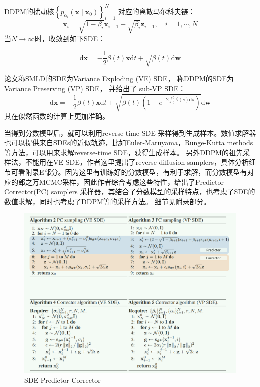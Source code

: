 \documentclass[lang=cn,newtx,10pt,scheme=chinese]{elegantbook}
\begin{document}
DDPM的扰动核$\left\{p_{\alpha_i}\left(\mathbf{x} \mid \mathbf{x}_0\right)\right\}_{i=1}^N$
对应的离散马尔科夫链：
\begin{equation}
\mathbf{x}_i=\sqrt{1-\beta_i} \mathbf{x}_{i-1}+\sqrt{\beta_i} \mathbf{z}_{i-1}, \quad i=1, \cdots, N
\end{equation}
当$N \rightarrow \infty$时，收敛到如下SDE：

\begin{equation}
\mathrm{d} \mathbf{x}=-\frac{1}{2} \beta(t) \mathbf{x} \mathrm{d} t+\sqrt{\beta(t)} \mathrm{d} \mathbf{w}
\end{equation}

论文称SMLD的SDE为Variance Exploding (VE) SDE， 称DDPM的SDE为Variance Preserving (VP) SDE， 并给出了 sub-VP SDE：
\begin{equation}
\mathrm{d} \mathbf{x}=-\frac{1}{2} \beta(t) \mathbf{x} \mathrm{d} t+\sqrt{\beta(t)\left(1-e^{-2 \int_0^t \beta(s) \mathrm{d} s}\right)} \mathrm{d} \mathbf{w}
\end{equation}其在似然函数的计算上更加准确。

当得到分数模型后，就可以利用reverse-time SDE 采样得到生成样本。数值求解器也可以提供来自SDEs的近似轨迹，比如Euler-Maruyama，Runge-Kutta methods等方法，可以用来求解reverse-time SDE，获得生成样本。
另外DDPM的祖先采样法，不能用在VE SDE，作者这里提出了reverse diffusion samplers，具体分析细节可看附录E部分。因为这里有训练好的分数模型，有利于求解，而分数模型有对应的郎之万MCMC采样，因此作者综合考虑这些特性，给出了Predictor-Corrector(PC) samplers 采样器，其结合了分数模型的采样特点，也考虑了SDE的数值求解，同时也考虑了DDPM等的采样方法。
细节见附录部分。
\begin{figure}[h!]
\centering
\includegraphics[scale=0.5]{image/PredictorCorrector.jpg}
\caption{SDE Predictor Corrector}
\label{fig:PC}
\end{figure}
\end{document}
